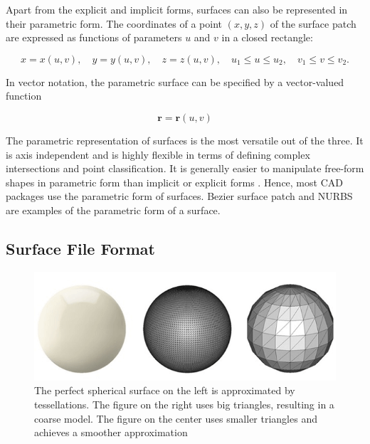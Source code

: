 Apart from the explicit and implicit forms, surfaces can also be represented in their parametric form. The coordinates of a point $(x,y,z)$ of the surface patch are expressed as functions of parameters $u$ and $v$ in a closed rectangle:

\begin{equation}
x=x(u, v), \quad y=y(u, v), \quad z=z(u, v), \quad u_{1} \leq u \leq u_{2}, \quad v_{1} \leq v \leq v_{2}.
\end{equation}

In vector notation, the parametric surface can be specified by a vector-valued function

\begin{equation}
\mathbf{r}=\mathbf{r}(u, v)
\end{equation}

The parametric representation of surfaces is the most versatile out of the three. It is axis independent and is highly flexible in terms of defining complex intersections and point classification. It is generally easier to manipulate free-form shapes in parametric form than implicit or explicit forms  \cite{patrikalakis2009shape}. Hence, most CAD packages use the parametric form of surfaces. Bezier surface patch and NURBS are examples of the parametric form of a surface.

\subsection{Surface File Format}


\begin{figure}
  \centering
  \includegraphics[width=\linewidth]{img/m1/tessellation.png}
  \caption{The perfect spherical surface on the left is approximated by tessellations. The figure on the right uses big triangles, resulting in a coarse model. The figure on the center uses smaller triangles and achieves a smoother approximation \cite{fileFormat}}
  \label{fig-tesellation}
\end{figure}

